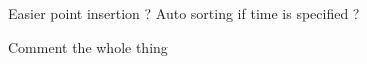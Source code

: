 
\begin{DoxyRefList}
\item[\label{todo__todo000001}%
\hypertarget{todo__todo000001}{}%
Class \hyperlink{class_cubic_spline}{Cubic\+Spline$<$ T, R $>$} ]Easier point insertion ? Auto sorting if time is specified ? 

Comment the whole thing
\end{DoxyRefList}